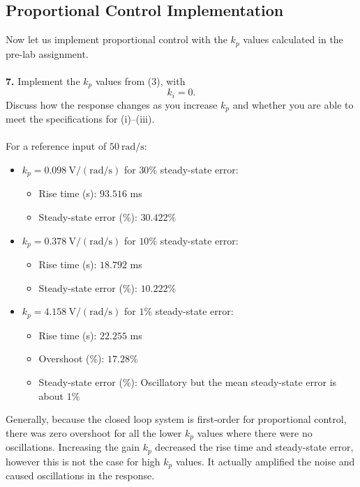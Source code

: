 ﻿\documentclass[12pt]{article}
\begin{document}
\subsection*{Proportional Control Implementation}
Now let us implement proportional control with the $k_p$ values calculated in the pre-lab assignment.\\\\
\textbf{7.} Implement the $k_p$ values from (3), with
\[
k_i=0.
\]
Discuss how the response changes as you increase $k_p$ and whether you are able to meet the specifications for (i)--(iii).\\\\
For a reference input of $50~\mathrm{rad/s}$:
\begin{itemize}
    \item $k_p = 0.098~\mathrm{V/(rad/s)}$ for $30\%$ steady-state error:
    \begin{itemize}
        \item Rise time (s): $93.516$ ms
        \item Steady-state error (\%): $30.422\%$
    \end{itemize}    
    \item $k_p=0.378~\mathrm{V/(rad/s)}$ for $10\%$ steady-state error:
    \begin{itemize}
        \item Rise time (s): $18.792$ ms
        \item Steady-state error (\%): $10.222\%$
    \end{itemize} 
    \newpage
    \item $k_p=4.158~\mathrm{V/(rad/s)}$ for $1\%$ steady-state error:
    \begin{itemize}
        \item Rise time (s): $22.255$ ms
        \item Overshoot (\%): $17.28\%$
        \item Steady-state error (\%): Oscillatory but the mean steady-state error is about $1\%$
    \end{itemize} 
\end{itemize}
    Generally, because the closed loop system is first-order for proportional control, there was zero overshoot for all the lower $k_p$ values where there were no oscillations. Increasing the gain $k_p$ decreased the rise time and steady-state error, however this is not the case for high $k_p$ values. It actually amplified the noise and caused oscillations in the response.\\\\
\end{document}

